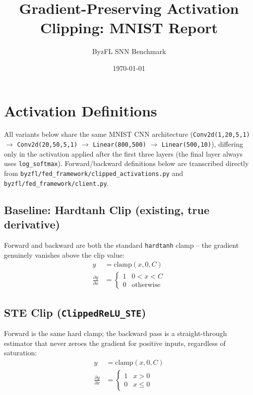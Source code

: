 \documentclass{article}
\title{Gradient-Preserving Activation Clipping: MNIST Report}
\author{ByzFL SNN Benchmark}
\date{\today}
\begin{document}
\maketitle

\clearpage
\tableofcontents
\clearpage

\section{Activation Definitions}

All variants below share the same MNIST CNN architecture
(\texttt{Conv2d(1,20,5,1)} $\to$ \texttt{Conv2d(20,50,5,1)} $\to$ \texttt{Linear(800,500)}
$\to$ \texttt{Linear(500,10)}), differing only in the activation applied after the first
three layers (the final layer always uses \texttt{log\_softmax}). Forward/backward
definitions below are transcribed directly from
\texttt{byzfl/fed\_framework/clipped\_activations.py} and
\texttt{byzfl/fed\_framework/client.py}.

\subsection{Baseline: Hardtanh Clip (existing, true derivative)}
Forward and backward are both the standard \texttt{hardtanh} clamp -- the gradient
genuinely vanishes above the clip value:
\begin{align*}
    y &= \mathrm{clamp}(x, 0, C) \\
    \frac{\partial y}{\partial x} &=
    \begin{cases}
        1 & 0 < x < C \\
        0 & \text{otherwise}
    \end{cases}
\end{align*}

\subsection{STE Clip (\texttt{ClippedReLU\_STE})}
Forward is the same hard clamp; the backward pass is a straight-through estimator that
never zeroes the gradient for positive inputs, regardless of saturation:
\begin{align*}
    y &= \mathrm{clamp}(x, 0, C) \\
    \frac{\partial y}{\partial x} &=
    \begin{cases}
        1 & x > 0 \\
        0 & x \leq 0
    \end{cases}
\end{align*}
\end{document}
